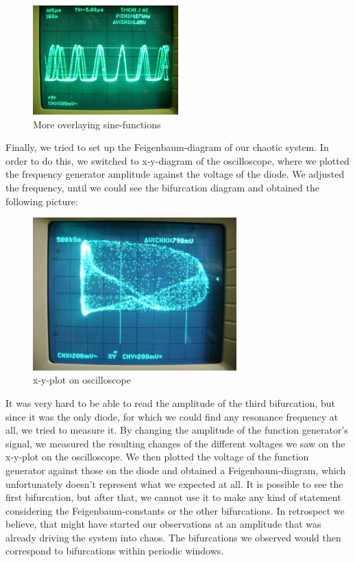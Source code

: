 \begin{figure}[H]
\centering \includegraphics[width=0.5\textwidth]{Fotos/03.JPG}
\caption{More overlaying sine-functions}
\end{figure}

Finally, we tried to set up the Feigenbaum-diagram of our chaotic system. In order to do this, we switched to x-y-diagram of the oscilloscope, where we plotted the frequency generator amplitude against the voltage of the diode. We adjusted the frequency, until we could see the bifurcation diagram and obtained the following picture:

\begin{figure}[H]
\centering \includegraphics[width= 0.7\textwidth]{Fotos/04.JPG}
\caption{x-y-plot on oscilloscope}
\end{figure}

It was very hard to be able to read the amplitude of the third bifurcation, but since it was the only diode, for which we could find any resonance frequency at all, we tried to measure it. By changing the amplitude of the function generator's signal, we measured the resulting changes of the different voltages we saw on the x-y-plot on the oscilloscope. We then plotted the voltage of the function generator against those on the diode and obtained a Feigenbaum-diagram, which unfortunately doesn't represent what we expected at all. It is possible to see the first bifurcation, but after that, we cannot use it to make any kind of statement considering the Feigenbaum-constants or the other bifurcations. In retrospect we believe, that might have started our observations at an amplitude that was already driving the system into chaos. The bifurcations we observed would then correspond to bifurcations within periodic windows.

